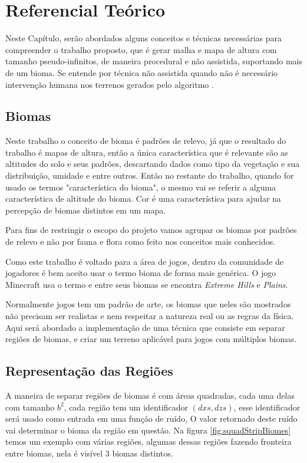 \chapter{Referencial Teórico}
Neste Capítulo, serão abordados alguns conceitos e técnicas necessárias para
compreender o trabalho proposto, que é 
gerar malha e mapa de altura com tamanho pseudo-infinitos, de maneira procedural
e não assistida, suportando mais de um bioma.
Se entende por técnica não assistida quando não é necessário intervenção humana nos 
terrenos gerados pelo algoritmo \cite{gabrielle2016canion}.

\section{Biomas}
Neste trabalho o conceito de bioma é padrões de relevo, já que o resultado do trabalho
é mapas de altura, então a única característica que é relevante
são as altitudes do solo e seus padrões, descartando dados como tipo da
vegetação e sua distribuição, umidade e entre outros. Então no restante 
do trabalho, quando for usado os termos "característica do bioma", o mesmo vai
se referir a alguma característica de altitude do bioma. Cor é uma característica 
para ajudar na percepção de biomas distintos em um mapa.

Para fins de restringir o escopo do projeto vamos agrupar os biomas por padrões
de relevo e não por fauna e flora como feito nos conceitos mais conhecidos.

Como este trabalho é voltado para a área de jogos, dentro da comunidade de jogadores
é bem aceito usar o termo bioma de forma mais genérica. O jogo Minecraft usa o
termo e entre seus biomas se encontra \textit{Extreme Hills} e \textit{Plains}.

Normalmente jogos tem um padrão de arte, os biomas que neles são mostrados não 
precisam ser realistas e nem respeitar a natureza real ou as regras da física. Aqui será 
abordado a implementação de uma técnica que consiste em separar regiões de biomas, e criar
um terreno aplicável para jogos com múltiplos biomas.

\section{Representação das Regiões}
A maneira de separar regiões de biomas é com áreas quadradas, cada uma delas com
tamanho $b^{2}$, cada região tem um identificador $(dxs, dzs)$, esse identificador
será usado como entrada em uma função de ruído, O valor retornado deste ruído vai 
determinar o bioma da região em questão. Na figura \ref{fig:squadStripBiomes} temos
um exemplo com várias regiões, algumas dessas regiões fazendo fronteira entre biomas, 
nela é visível 3 biomas distintos.

